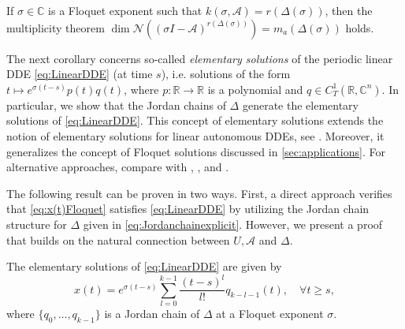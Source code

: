 \documentclass[english]{myarticle}
\begin{document}
\begin{sloppypar}
\begin{corollary} \label{cor:multiplicityDDE}
If $\sigma \in \mathbb{C}$ is a Floquet exponent such that $k(\sigma,\mathcal{A}) = r(\Delta(\sigma))$, then the multiplicity theorem $\dim \mathcal{N}((\sigma I - \mathcal{A})^{r(\Delta(\sigma))}) =  m_a(\Delta(\sigma))$ holds.
\end{corollary}

The next corollary concerns so-called \emph{elementary solutions} of the periodic linear DDE \eqref{eq:LinearDDE} (at time $s$), i.e. solutions of the form $t \mapsto e^{\sigma (t-s)}p(t)q(t)$, where $p : \mathbb{R} \to \mathbb{R}$ is a polynomial and $q \in C_T^1(\mathbb{R},\mathbb{C}^n)$. In particular, we show that the Jordan chains of $\Delta$ generate the elementary solutions of \eqref{eq:LinearDDE}. This concept of elementary solutions extends the notion of elementary solutions for linear autonomous DDEs, see \cite[Corollary II.1.1.4]{Kaashoek1992}. Moreover, it generalizes the concept of Floquet solutions discussed in \cref{sec:applications}. For alternative approaches, compare with \cite[Lemma 8.1.2]{Hale1993}, \cite[Section XIII.4]{Diekmann1995}, and \cite[Section 11.2]{Kaashoek2022}.

The following result can be proven in two ways. First, a direct approach verifies that \eqref{eq:x(t)Floquet} satisfies \eqref{eq:LinearDDE} by utilizing the Jordan chain structure for $\Delta$ given in \eqref{eq:Jordanchainexplicit}. However, we present a proof that builds on the natural connection between $U, \mathcal{A}$ and $\Delta$.

\begin{corollary} \label{cor:FloquetsolDDE}
The elementary solutions of \eqref{eq:LinearDDE} are given by
    \begin{equation} \label{eq:x(t)Floquet}
        x(t) = e^{\sigma(t-s)} \sum_{l=0}^{k-1} \frac{(t-s)^l}{l!}q_{k-l-1}(t), \quad \forall t \geq s,
    \end{equation}
where $\{{q}_{0},\dots,{q}_{k-1} \}$ is a Jordan chain of $\Delta$ at a Floquet exponent $\sigma$.
\end{corollary}


\end{sloppypar}
\end{document}
